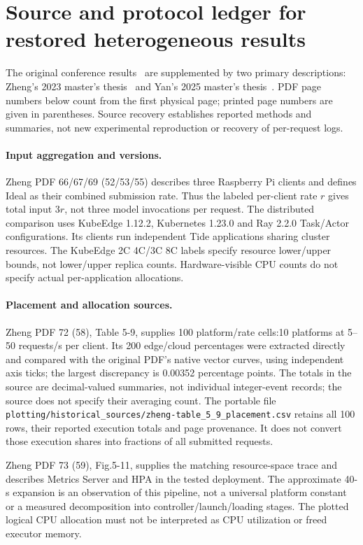 \clearpage
\section*{Source and protocol ledger for restored heterogeneous results}
The original conference results~\cite{Tide2025} are supplemented by two primary descriptions: Zheng's 2023 master's thesis~\cite{zheng2023tideThesis} and Yan's 2025 master's thesis~\cite{yan2025tideThesis}. PDF page numbers below count from the first physical page; printed page numbers are given in parentheses. Source recovery establishes reported methods and summaries, not new experimental reproduction or recovery of per-request logs.

\paragraph{Input aggregation and versions.}
Zheng PDF 66/67/69 (52/53/55) describes three Raspberry Pi clients and defines Ideal as their combined submission rate. Thus the labeled per-client rate $r$ gives total input $3r$, not three model invocations per request. The distributed comparison uses KubeEdge 1.12.2, Kubernetes 1.23.0 and Ray 2.2.0 Task/Actor configurations. Its clients run independent Tide applications sharing cluster resources. The KubeEdge 2C 4C/3C 8C labels specify resource lower/upper bounds, not lower/upper replica counts. Hardware-visible CPU counts do not specify actual per-application allocations.

\paragraph{Placement and allocation sources.}
Zheng PDF 72 (58), Table 5-9, supplies 100 platform/rate cells:10 platforms at 5--50 requests/s per client. Its 200 edge/cloud percentages were extracted directly and compared with the original PDF's native vector curves, using independent axis ticks; the largest discrepancy is 0.00352 percentage points. The totals in the source are decimal-valued summaries, not individual integer-event records; the source does not specify their averaging count. The portable file \texttt{plotting/historical\_sources/zheng-table\_5\_9\_placement.csv} retains all 100 rows, their reported execution totals and page provenance. It does not convert those execution shares into fractions of all submitted requests.

Zheng PDF 73 (59), Fig.5-11, supplies the matching resource-space trace and describes Metrics Server and HPA in the tested deployment. The approximate 40-s expansion is an observation of this pipeline, not a universal platform constant or a measured decomposition into controller/launch/loading stages. The plotted logical CPU allocation must not be interpreted as CPU utilization or freed executor memory.

